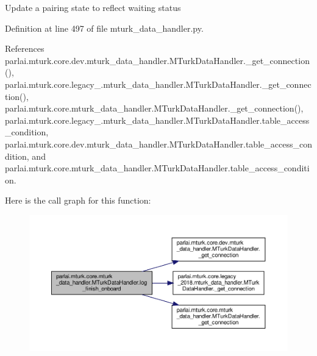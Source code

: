 \begin{DoxyVerb}Update a pairing state to reflect waiting status\end{DoxyVerb}
 

Definition at line 497 of file mturk\+\_\+data\+\_\+handler.\+py.



References parlai.\+mturk.\+core.\+dev.\+mturk\+\_\+data\+\_\+handler.\+M\+Turk\+Data\+Handler.\+\_\+get\+\_\+connection(), parlai.\+mturk.\+core.\+legacy\+\_.\+mturk\+\_\+data\+\_\+handler.\+M\+Turk\+Data\+Handler.\+\_\+get\+\_\+connection(), parlai.\+mturk.\+core.\+mturk\+\_\+data\+\_\+handler.\+M\+Turk\+Data\+Handler.\+\_\+get\+\_\+connection(), parlai.\+mturk.\+core.\+legacy\+\_.\+mturk\+\_\+data\+\_\+handler.\+M\+Turk\+Data\+Handler.\+table\+\_\+access\+\_\+condition, parlai.\+mturk.\+core.\+dev.\+mturk\+\_\+data\+\_\+handler.\+M\+Turk\+Data\+Handler.\+table\+\_\+access\+\_\+condition, and parlai.\+mturk.\+core.\+mturk\+\_\+data\+\_\+handler.\+M\+Turk\+Data\+Handler.\+table\+\_\+access\+\_\+condition.

Here is the call graph for this function\+:
\nopagebreak
\begin{figure}[H]
\begin{center}
\leavevmode
\includegraphics[width=350pt]{classparlai_1_1mturk_1_1core_1_1mturk__data__handler_1_1MTurkDataHandler_a2e2a4005391d49b70050c73315424f5a_cgraph}
\end{center}
\end{figure}
\mbox{\label{classparlai_1_1mturk_1_1core_1_1mturk__data__handler_1_1MTurkDataHandler_acfa910fb6805c19a8693b7688f1fb133}} 
